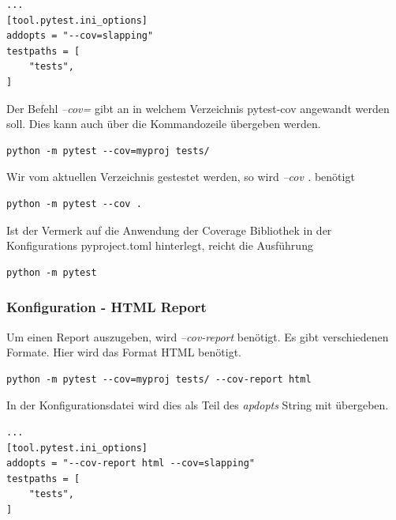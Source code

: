 \begin{lstlisting}[style=Config, caption={Beispiel pyproject.toml; Slapping pytest config}, captionpos=b]
...
[tool.pytest.ini_options]
addopts = "--cov=slapping"
testpaths = [
	"tests",
]
\end{lstlisting}
Der Befehl \textit{--cov=} gibt an in welchem Verzeichnis pytest-cov angewandt werden soll. Dies kann auch über die Kommandozeile übergeben werden.

\begin{lstlisting}[style=CMD, caption={Bsp. Befehl zum Ausführen von pytest cov}, captionpos=b]
python -m pytest --cov=myproj tests/	
\end{lstlisting}

Wir vom aktuellen Verzeichnis gestestet werden, so wird \textit{--cov .} benötigt

\begin{lstlisting}[style=CMD, caption={Bsp. Befehl zum Ausführen von pytest cov - Same directory}, captionpos=b]
python -m pytest --cov .
\end{lstlisting}

Ist der Vermerk auf die Anwendung der Coverage Bibliothek in der Konfigurations pyproject.toml hinterlegt, reicht die Ausführung

\begin{lstlisting}[style=CMD, caption={Bsp. Befehl zum Ausführen von pytest und cov, config erfüllt}, captionpos=b]
python -m pytest
\end{lstlisting}

\subsubsection{Konfiguration - HTML Report}
Um einen Report auszugeben, wird \textit{--cov-report} benötigt. Es gibt verschiedenen Formate. Hier wird das Format \gls{HTML} benötigt.

\begin{lstlisting}[style=CMD, caption={Bsp. Befehl zum Ausführen von pytest cov}, captionpos=b]
python -m pytest --cov=myproj tests/ --cov-report html
\end{lstlisting}

In der Konfigurationsdatei wird dies als Teil des \textit{apdopts} String mit übergeben.

\begin{lstlisting}[style=Config, caption={Beispiel pyproject.toml; Slapping pytest config}, captionpos=b]
...
[tool.pytest.ini_options]
addopts = "--cov-report html --cov=slapping"
testpaths = [
	"tests",
]
\end{lstlisting}

